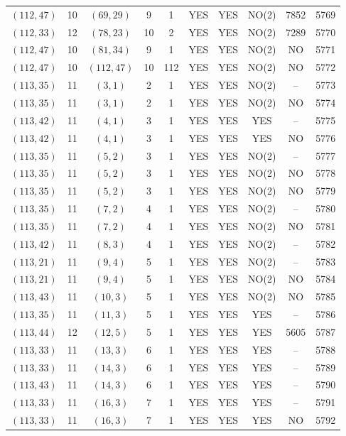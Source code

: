 \begin{longtable}{|c|c|c|c|c|c|c|c|c|c|}
$(112, 47)$ & 10 & $(69, 29)$ & 9 & 1 & YES & YES & NO(2) & 7852 & 5769\\
$(112, 33)$ & 12 & $(78, 23)$ & 10 & 2 & YES & YES & NO(2) & 7289 & 5770\\
$(112, 47)$ & 10 & $(81, 34)$ & 9 & 1 & YES & YES & NO(2) & NO & 5771\\
$(112, 47)$ & 10 & $(112, 47)$ & 10 & 112 & YES & YES & NO(2) & NO & 5772\\
$(113, 35)$ & 11 & $(3, 1)$ & 2 & 1 & YES & YES & NO(2) & -- & 5773\\
$(113, 35)$ & 11 & $(3, 1)$ & 2 & 1 & YES & YES & NO(2) & NO & 5774\\
$(113, 42)$ & 11 & $(4, 1)$ & 3 & 1 & YES & YES & YES & -- & 5775\\
$(113, 42)$ & 11 & $(4, 1)$ & 3 & 1 & YES & YES & YES & NO & 5776\\
$(113, 35)$ & 11 & $(5, 2)$ & 3 & 1 & YES & YES & NO(2) & -- & 5777\\
$(113, 35)$ & 11 & $(5, 2)$ & 3 & 1 & YES & YES & NO(2) & NO & 5778\\
$(113, 35)$ & 11 & $(5, 2)$ & 3 & 1 & YES & YES & NO(2) & NO & 5779\\
$(113, 35)$ & 11 & $(7, 2)$ & 4 & 1 & YES & YES & NO(2) & -- & 5780\\
$(113, 35)$ & 11 & $(7, 2)$ & 4 & 1 & YES & YES & NO(2) & NO & 5781\\
$(113, 42)$ & 11 & $(8, 3)$ & 4 & 1 & YES & YES & NO(2) & -- & 5782\\
$(113, 21)$ & 11 & $(9, 4)$ & 5 & 1 & YES & YES & NO(2) & -- & 5783\\
$(113, 21)$ & 11 & $(9, 4)$ & 5 & 1 & YES & YES & NO(2) & NO & 5784\\
$(113, 43)$ & 11 & $(10, 3)$ & 5 & 1 & YES & YES & NO(2) & NO & 5785\\
$(113, 35)$ & 11 & $(11, 3)$ & 5 & 1 & YES & YES & YES & -- & 5786\\
$(113, 44)$ & 12 & $(12, 5)$ & 5 & 1 & YES & YES & YES & 5605 & 5787\\
$(113, 33)$ & 11 & $(13, 3)$ & 6 & 1 & YES & YES & YES & -- & 5788\\
$(113, 33)$ & 11 & $(14, 3)$ & 6 & 1 & YES & YES & YES & -- & 5789\\
$(113, 43)$ & 11 & $(14, 3)$ & 6 & 1 & YES & YES & YES & -- & 5790\\
$(113, 33)$ & 11 & $(16, 3)$ & 7 & 1 & YES & YES & YES & -- & 5791\\
$(113, 33)$ & 11 & $(16, 3)$ & 7 & 1 & YES & YES & YES & NO & 5792\\

\end{longtable}
